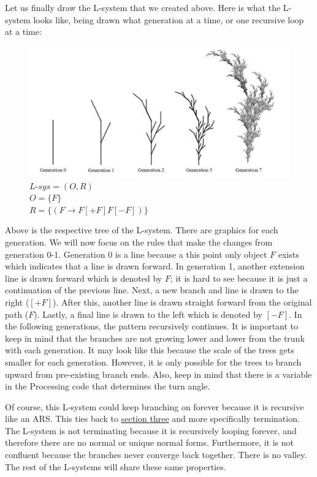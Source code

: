 \documentclass{article}
\begin{document}
\medskip\noindent
Let us finally draw the L-system that we created above. Here is what the L-system looks like, being drawn what generation at a time, or one recursive loop at a time:

\begin{figure}[H]
  \centering
  \includegraphics[scale=.3]{treeAs.PNG}
  \caption[] {
    $L$-$sys = (O, R)$
    \\ $O = \{ F \}$
    \\ $R = \{ (F \rightarrow F[+F]F[-F]) \}$
    \endtabular}
\end{figure}

\medskip\noindent
Above is the respective tree of the L-system. There are graphics for each generation. We will now focus on the rules that make the changes from generation 0-1. Generation 0 is a line because a this point only object $F$ exists which indicates that a line is drawn forward. In generation 1, another extension line is drawn forward which is denoted by $F$; it is hard to see because it is just a continuation of the previous line. Next, a new branch and line is drawn to the right ($[+F]$). After this, another line is drawn straight forward from the original path ($F$). Lastly, a final line is drawn to the left which is denoted by $[-F]$. In the following generations, the pattern recursively continues. It is important to keep in mind that the branches are not growing lower and lower from the trunk with each generation. It may look like this because the scale of the trees gets smaller for each generation. However, it is only possible for the trees to branch upward from pre-existing branch ends. Also, keep in mind that there is a variable in the Processing code that determines the turn angle.

\medskip\noindent
Of course, this L-system could keep branching on forever because it is recursive like an ARS. This ties back to  \hyperref[sec:PLT]{section three} and more specifically termination. The L-system is not terminating because it is recursively looping forever, and therefore there are no normal or unique normal forms. Furthermore, it is not confluent because the branches never converge back together. There is no valley. The rest of the L-systems will share these same properties.
\end{document}
